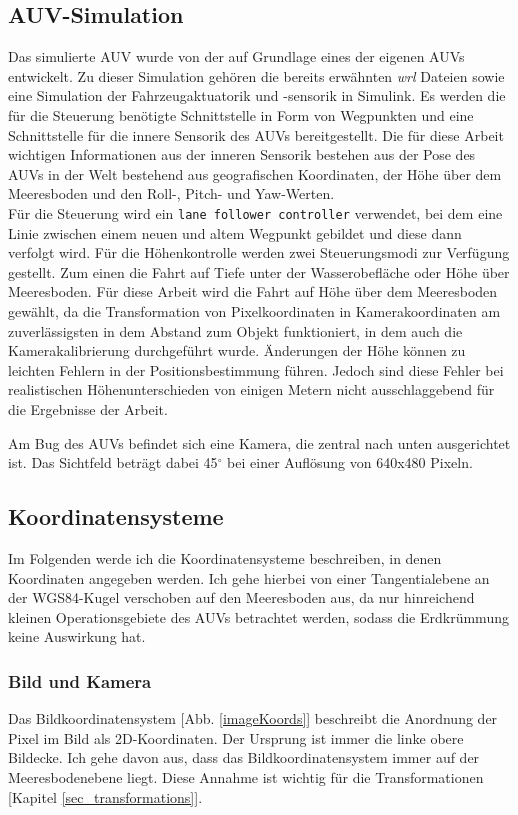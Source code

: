 \subsection{AUV-Simulation}
\label{sec_auvSimGrundlage}
Das simulierte AUV wurde von der \atlas auf Grundlage eines der eigenen AUVs entwickelt. Zu dieser Simulation gehören die bereits erwähnten \textit{wrl} Dateien sowie eine Simulation der Fahrzeugaktuatorik und -sensorik in \matlab Simulink. Es werden die für die Steuerung benötigte Schnittstelle in Form von Wegpunkten und eine Schnittstelle für die innere Sensorik des AUVs bereitgestellt. Die für diese Arbeit wichtigen Informationen aus der inneren Sensorik bestehen aus der Pose des AUVs in der Welt bestehend aus geografischen Koordinaten, der Höhe über dem Meeresboden und den Roll-, Pitch- und Yaw-Werten.\\
Für die Steuerung wird ein \texttt{lane follower controller} verwendet, bei dem eine Linie zwischen einem neuen und altem Wegpunkt gebildet und diese dann verfolgt wird. Für die Höhenkontrolle werden zwei Steuerungsmodi zur Verfügung gestellt. Zum einen die Fahrt auf Tiefe unter der Wasserobefläche oder Höhe über Meeresboden. Für diese Arbeit wird die Fahrt auf Höhe über dem Meeresboden gewählt, da die Transformation von Pixelkoordinaten in Kamerakoordinaten am zuverlässigsten in dem Abstand zum Objekt funktioniert, in dem auch die Kamerakalibrierung durchgeführt wurde. Änderungen der Höhe können zu leichten Fehlern in der Positionsbestimmung führen. Jedoch sind diese Fehler bei realistischen Höhenunterschieden von einigen Metern nicht ausschlaggebend für die Ergebnisse der Arbeit.

Am Bug des AUVs befindet sich eine Kamera, die zentral nach unten ausgerichtet ist. Das Sichtfeld beträgt dabei 45$^\circ$ bei einer Auflösung von 640x480 Pixeln.
\subsection{Koordinatensysteme}

Im Folgenden werde ich die Koordinatensysteme beschreiben, in denen Koordinaten angegeben werden. Ich gehe hierbei von einer Tangentialebene an der WGS84-Kugel verschoben auf den Meeresboden aus, da nur hinreichend kleinen Operationsgebiete des AUVs betrachtet werden, sodass die Erdkrümmung keine Auswirkung hat.
\subsubsection{Bild und Kamera}
\label{sec_img_cam_coords}
Das Bildkoordinatensystem [Abb. \ref{imageKoords}] beschreibt die Anordnung der Pixel im Bild als 2D-Koordinaten. Der Ursprung ist immer die linke obere Bildecke. Ich gehe davon aus, dass das Bildkoordinatensystem immer auf der Meeresbodenebene liegt. Diese Annahme ist wichtig für die Transformationen [Kapitel \ref{sec_transformations}].

